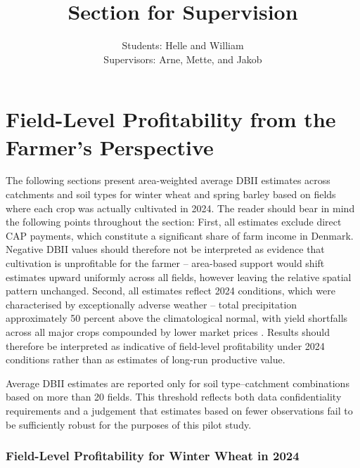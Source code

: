 \documentclass[12pt]{article}
\title{\textbf{Section for Supervision}}
\author{Students: Helle and William \\
Supervisors: Arne, Mette, and Jakob}
\begin{document}
\maketitle

\section{Field-Level Profitability from the Farmer's Perspective} 
\label{sec:Farmer Profitability}

The following sections present area-weighted average DBII estimates across catchments and soil types for winter wheat and spring barley based on fields where each crop was actually cultivated in 2024. 
The reader should bear in mind the following points throughout the section: First, all estimates exclude direct CAP payments, which constitute a significant share of farm income in Denmark. Negative DBII values should therefore not be interpreted as evidence that cultivation is unprofitable for the farmer -- area-based support would shift estimates upward uniformly across all fields, however leaving the relative spatial pattern unchanged. Second, all estimates reflect 2024 conditions, which were characterised by exceptionally adverse weather -- total precipitation approximately 50 percent above the climatological normal, with yield shortfalls across all major crops compounded by lower market prices \citep{bramsen2024}. Results should therefore be interpreted as indicative of field-level profitability under 2024 conditions rather than as estimates of long-run productive value. 

Average DBII estimates are reported only for soil type--catchment combinations based 
on more than 20 fields. This threshold reflects both data confidentiality requirements 
and a judgement that estimates based on fewer observations fail to be sufficiently robust 
for the purposes of this pilot study. 



\subsubsection{Field-Level Profitability for Winter Wheat in 2024} 
\end{document}
